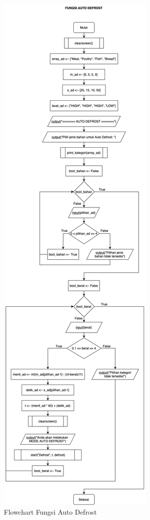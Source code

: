 \documentclass[conference]{IEEEtran}
\begin{document}
\begin{figure}[htbp]
    \centering
    \def\svgwidth{\columnwidth}
    \centerline{\includegraphics[scale=0.33]{AutoDefrost.png}}
    \caption{Flowchart Fungsi Auto Defrost}
    \label{fig9}
\end{figure}
\end{document}
